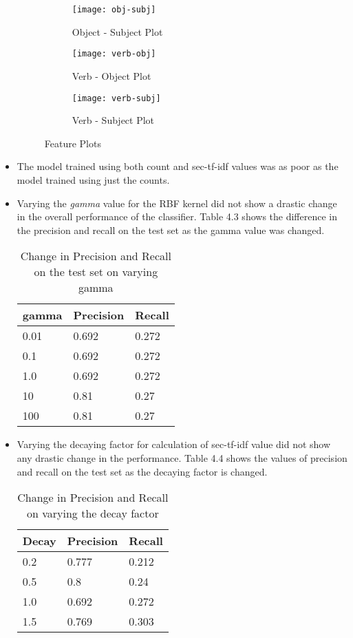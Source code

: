 \begin{itemize}
\begin{figure}[h]
\begin{subfigure}{0.5\textwidth}
\texttt{[image: obj-subj]} 
\caption{Object - Subject Plot}
\label{fig:objsub}
\end{subfigure}
\begin{subfigure}{0.5\textwidth}
\texttt{[image: verb-obj]}
\caption{Verb - Object Plot}
\label{fig:verbobj}
\end{subfigure}
\begin{subfigure}{0.5\textwidth}
\texttt{[image: verb-subj]}
\caption{Verb - Subject Plot}
\label{fig:verbsubj}
\end{subfigure} 
\caption{Feature Plots}
\label{fig:feature-plots}
\end{figure}

\item The model trained using both count and sec-tf-idf values was as poor as the model trained using just the counts.
\item Varying the \textit{gamma} value for the RBF kernel did not show a drastic change in the overall performance of the classifier.
Table 4.3 shows the difference in the precision and recall on the test set as the gamma value was changed.
\begin{table}[h]
\centering
\caption{Change in Precision and Recall on the test set on varying gamma}
\begin{tabular}{|l|l|l|}
\hline
gamma & Precision & Recall \\ \hline
0.01  & 0.692     & 0.272  \\ \hline
0.1   & 0.692     & 0.272  \\ \hline
1.0   & 0.692     & 0.272  \\ \hline
10    & 0.81      & 0.27   \\ \hline
100   & 0.81      & 0.27   \\ \hline
\end{tabular}
\end{table}
\item Varying the decaying factor for calculation of sec-tf-idf value did not show any drastic change in the performance.
Table 4.4 shows the values of precision and recall on the test set as the decaying factor is changed.
\begin{table}[h]
\centering
\caption{Change in Precision and Recall on varying the decay factor}
\begin{tabular}{|l|l|l|}
\hline
Decay & Precision & Recall \\ \hline
0.2   & 0.777     & 0.212  \\ \hline
0.5   & 0.8       & 0.24   \\ \hline
1.0   & 0.692     & 0.272  \\ \hline
1.5   & 0.769     & 0.303  \\ \hline
\end{tabular}
\end{table}
\end{itemize}

